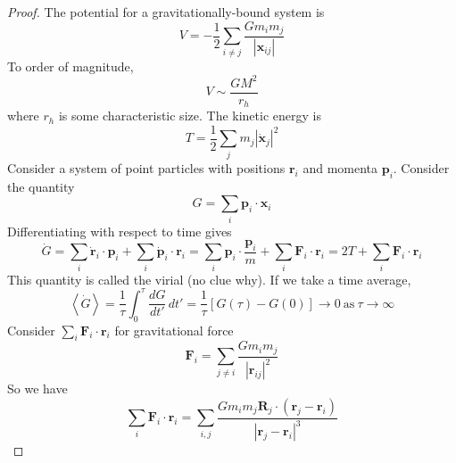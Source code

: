 \documentclass[10pt]{article}
\newcommand{\n}{\noindent}
\newcommand{\norm}[1]{\left|#1\right|}
\newcommand{\avg}[1]{\left<#1\right>}
\begin{document}
	\n\begin{proof}
		The potential for a gravitationally-bound system is
		$$V=-\frac{1}{2}\sum_{i\neq j}\frac{Gm_im_j}{\norm{\mathbf{x}_{ij}}}$$
		To order of magnitude, 
		$$V \sim \frac{GM^2}{r_h}$$
		where $r_h$ is some characteristic size. The kinetic energy is
		$$T = \frac{1}{2}\sum_j m_j\norm{\dot{\mathbf{x}}_j}^2$$
		Consider a system of point particles with positions $\mathbf{r}_i$ and momenta $\mathbf{p}_i$. Consider the quantity
		$$G=\sum_{i}\mathbf{p}_i\cdot\mathbf{x}_i$$
		Differentiating with respect to time gives
		$$\dot{G} = \sum_i \dot{\mathbf{r}}_i\cdot \mathbf{p}_i+\sum_i\dot{\mathbf{p}}_i\cdot\mathbf{r}_i=\sum_i\mathbf{p}_i\cdot\frac{\mathbf{p}_i}{m}+\sum_i\mathbf{F}_i\cdot\mathbf{r}_i = 2T+\sum_i\mathbf{F}_i\cdot\mathbf{r}_i$$
		This quantity is called the virial (no clue why). If we take a time average,
		$$\avg{\dot{G}} = \frac{1}{\tau}\int_0^\tau\frac{dG}{dt'}\,dt' = \frac{1}{\tau}\left[G(\tau)-G(0)\right]\to 0\ \textrm{as}\ \tau\to \infty$$
		Consider $\sum_i\mathbf{F}_i\cdot\mathbf{r}_i$ for gravitational force
		$$\mathbf{F}_i = \sum_{j\neq i}\frac{Gm_im_j}{\norm{\mathbf{r}_{ij}}^2}$$
		So we have
		$$\sum_i \mathbf{F}_i\cdot\mathbf{r}_i=\sum_{i,j}\frac{Gm_im_j\mathbf{R}_j\cdot(\mathbf{r}_j-\mathbf{r}_i)}{\norm{\mathbf{r}_j-\mathbf{r}_i}^3}$$
		
	\end{proof}
	
	
	
	
\end{document}
